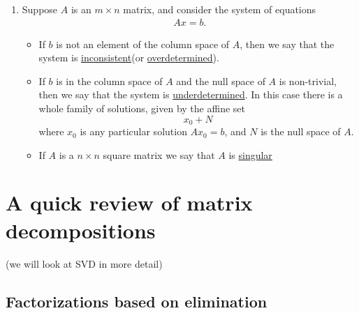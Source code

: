 \begin{enumerate}
\item Suppose $A$ is an $m\times n$ matrix, and consider the system of equations 
    \begin{align*}
        Ax = b.
    \end{align*}
    \begin{itemize}
        \item If $b$ is not an element of the column space of $A$, then we say that the system is \underline{inconsistent}(or \underline{overdetermined}). 
        \item If $b$ is in the column space of $A$ and the null space of $A$ is non-trivial, then we say that the system is \underline{underdetermined}. In this case there is a whole family of solutions, given by the affine set
            $$x_0 + N$$
        where $x_0$ is any particular solution $Ax_0 = b$, and $N$ is the null space of $A$. 
        \item If $A$ is a $n\times n$ square matrix we say that $A$ is \underline{singular}
    \end{itemize}
\end{enumerate}

\newpage
\section{A quick review of matrix decompositions}
(we will look at SVD in more detail)

\subsection{Factorizations based on elimination}

